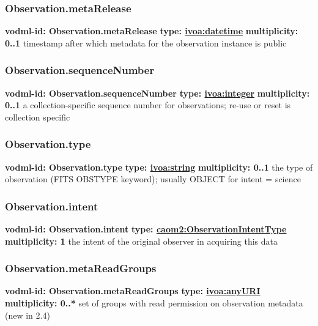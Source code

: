     \subsubsection{Observation.metaRelease}
      \textbf{vodml-id: Observation.metaRelease} \newline
      \textbf{type: \hyperref[sect:ivoa]{ivoa:datetime}} \newline
      \textbf{multiplicity: 0..1} \newline
      timestamp after which metadata for the observation instance is public

    \subsubsection{Observation.sequenceNumber}
      \textbf{vodml-id: Observation.sequenceNumber} \newline
      \textbf{type: \hyperref[sect:ivoa]{ivoa:integer}} \newline
      \textbf{multiplicity: 0..1} \newline
      a collection-specific sequence number for observations; re-use or reset is collection specific

    \subsubsection{Observation.type}
      \textbf{vodml-id: Observation.type} \newline
      \textbf{type: \hyperref[sect:ivoa]{ivoa:string}} \newline
      \textbf{multiplicity: 0..1} \newline
      the type of observation (FITS OBSTYPE keyword); usually OBJECT for intent = science

    \subsubsection{Observation.intent}
      \textbf{vodml-id: Observation.intent} \newline
      \textbf{type: \hyperref[sect:ObservationIntentType]{caom2:ObservationIntentType}} \newline
      \textbf{multiplicity: 1} \newline
      the intent of the original observer in acquiring this data

    \subsubsection{Observation.metaReadGroups}
      \textbf{vodml-id: Observation.metaReadGroups} \newline
      \textbf{type: \hyperref[sect:ivoa]{ivoa:anyURI}} \newline
      \textbf{multiplicity: 0..*} \newline
      set of groups with read permission on observation metadata (new in 2.4)

